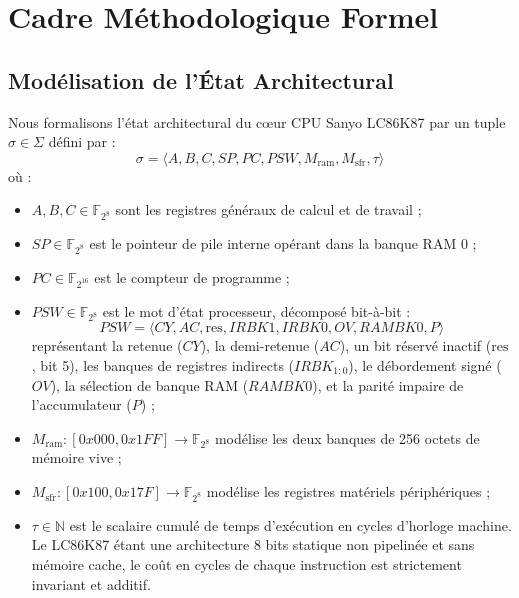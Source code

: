 \documentclass[10pt,journal,compsoc]{IEEEtran}
\begin{document}
\section{Cadre Méthodologique Formel}

\subsection{Modélisation de l'État Architectural}
Nous formalisons l'état architectural du cœur CPU Sanyo LC86K87 par un tuple $\sigma \in \Sigma$ défini par :
\begin{equation}
\sigma = \langle A, B, C, SP, PC, PSW, M_{\text{ram}}, M_{\text{sfr}}, \tau \rangle
\end{equation}
où :
\begin{itemize}
    \item $A, B, C \in \mathbb{F}_{2^8}$ sont les registres généraux de calcul et de travail ;
    \item $SP \in \mathbb{F}_{2^8}$ est le pointeur de pile interne opérant dans la banque RAM 0 ;
    \item $PC \in \mathbb{F}_{2^{16}}$ est le compteur de programme ;
    \item $PSW \in \mathbb{F}_{2^8}$ est le mot d'état processeur, décomposé bit-à-bit :
    \begin{equation}
    PSW = \langle CY, AC, \text{res}, IRBK1, IRBK0, OV, RAMBK0, P \rangle
    \end{equation}
    représentant la retenue ($CY$), la demi-retenue ($AC$), un bit réservé inactif ($\text{res}$, bit 5), les banques de registres indirects ($IRBK_{1:0}$), le débordement signé ($OV$), la sélection de banque RAM ($RAMBK0$), et la parité impaire de l'accumulateur ($P$) ;
    \item $M_{\text{ram}} : [0x000, 0x1FF] \to \mathbb{F}_{2^8}$ modélise les deux banques de 256 octets de mémoire vive ;
    \item $M_{\text{sfr}} : [0x100, 0x17F] \to \mathbb{F}_{2^8}$ modélise les registres matériels périphériques ;
    \item $\tau \in \mathbb{N}$ est le scalaire cumulé de temps d'exécution en cycles d'horloge machine. Le LC86K87 étant une architecture 8 bits statique non pipelinée et sans mémoire cache, le coût en cycles de chaque instruction est strictement invariant et additif.
\end{itemize}
\end{document}
